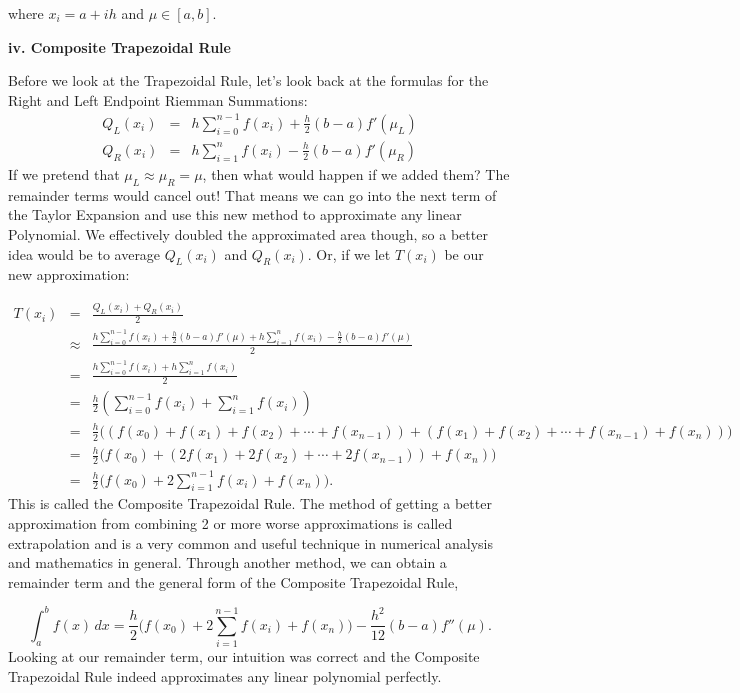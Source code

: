 \documentclass[12pt]{article}
\newcommand{\newLine}{\vspace{5mm}}
\newcommand{\nextsubsection}[1]{\newLine \noindent \large \textbf{#1} \normalsize}
\newcommand{\integral}[3]{\text{$\int^{#2}_{#1} #3\,dx$}}
\newcommand{\summation}[3]{\text{$\sum^{#2}_{#1} #3$}}
\begin{document}
where $x_i = a + ih$ and $\mu\in[a,b]$.

\nextsubsection{iv. Composite Trapezoidal Rule}

\newLine Before we look at the Trapezoidal Rule, let's look back at the formulas for the Right and Left Endpoint Riemman Summations:
\begin{eqnarray*} Q_L(x_i) &=& h\summation{i = 0}{n - 1}{f(x_i)} + \frac{h}{2}(b-a)f'(\mu_L) \\
Q_R(x_i) &=& h\summation{i = 1}{n}{f(x_i)} - \frac{h}{2}(b-a)f'(\mu_R)
\end{eqnarray*}
If we pretend that $\mu_L \approx \mu_R = \mu$, then what would happen if we added them? The remainder terms would cancel out! That means we can go into the next term of the Taylor Expansion and use this new method to approximate any linear Polynomial. We effectively doubled the approximated area though, so a better idea would be to average $Q_L(x_i)$ and $Q_R(x_i)$. Or, if we let $T(x_i)$ be our new approximation:

\begin{eqnarray*} T(x_i) &=& \frac{Q_L(x_i) + Q_R(x_i)}{2} \\
&\approx& \frac{h\summation{i = 0}{n - 1}{f(x_i)} + \frac{h}{2}(b-a)f'(\mu) + h\summation{i = 1}{n}{f(x_i)} - \frac{h}{2}(b-a)f'(\mu)}{2} \\
&=& \frac{h\summation{i = 0}{n - 1}{f(x_i)} + h\summation{i = 1}{n}{f(x_i)}}{2} \\
&=& \frac{h}{2}\left(\summation{i = 0}{n - 1}{f(x_i)} + \summation{i = 1}{n}{f(x_i)}\right) \\
&=& \frac{h}{2}\Big((f(x_0) + f(x_1) + f(x_2) + \cdots + f(x_{n-1})) + (f(x_1) + f(x_2) + \cdots + f(x_{n-1}) + f(x_n))\Big) \\
&=& \frac{h}{2}\Big(f(x_0) + (2f(x_1) + 2f(x_2) + \cdots + 2f(x_{n-1})) + f(x_n)\Big) \\
&=& \frac{h}{2}\Big(f(x_0) + 2\summation{i=1}{n-1}f(x_i) + f(x_n)\Big).
\end{eqnarray*}
This is called the Composite Trapezoidal Rule. The method of getting a better approximation from combining 2 or more worse approximations is called extrapolation and is a very common and useful technique in numerical analysis and mathematics in general. Through another method, we can obtain a remainder term and the general form of the Composite Trapezoidal Rule,

\begin{equation*} 
\integral{a}{b}{f(x)} = \frac{h}{2}\Big(f(x_0) + 2\summation{i = 1}{n-1}{f(x_i)} + f(x_n)\Big) - \frac{h^2}{12}(b-a)f''(\mu).
\end{equation*}
Looking at our remainder term, our intuition was correct and the Composite Trapezoidal Rule indeed approximates any linear polynomial perfectly.
\end{document}
